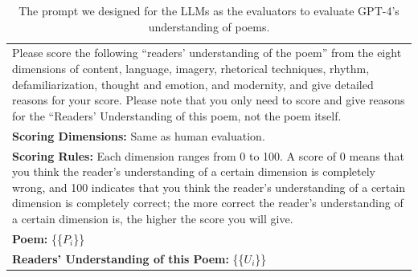 \documentclass[11pt]{article}
\newcommand{\PARASPACE}[1]{\setlength{\baselineskip}{0.7\baselineskip}#1}
\newcommand{\MYFONTSIZE}[1]{\PARASPACE{{\fontsize{8}{9}\selectfont {{#1}}}}}
\begin{document}
\begin{table}[t]
\small
\begin{tabular}{p{7.0cm}} 
\hline
Please score the following ``readers' understanding of the poem'' from the eight dimensions of content, language, imagery, rhetorical techniques, rhythm, defamiliarization, thought and emotion, and modernity, and give detailed reasons for your score. Please note that you only need to score and give reasons for the ``Readers' Understanding of this poem, not the poem itself.  \\
\vspace{0.001cm}
\textbf{Scoring Dimensions:} Same as human evaluation. \\
\vspace{0.001cm}
\textbf{Scoring Rules:} Each dimension ranges from 0 to 100. A score of 0 means that you think the reader's understanding of a certain dimension is completely wrong, and 100 indicates that you think the reader's understanding of a certain dimension is completely correct; the more correct the reader's understanding of a certain dimension is, the higher the score you will give.  \\
\vspace{0.001cm}
\textbf{Poem:} \{\{$P_i$\}\}   \\
\vspace{0.001cm}
\textbf{Readers' Understanding of this Poem:} \{\{$U_i$\}\}  \\
\hline
\end{tabular}
\caption{\label{The Prompt we designed for the LLMs (without enhancement) as the evaluators}The prompt we designed for the LLMs as the evaluators to evaluate GPT-4’s understanding of poems.}
\end{table}
\end{document}
